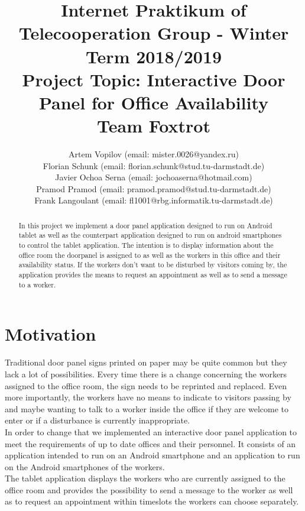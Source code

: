 \documentclass[article,colorback,accentcolor=tud4c, 11pt]{tudreport}
\title{Internet Praktikum of Telecooperation Group - Winter Term 2018/2019\\
	Project Topic: Interactive Door Panel for Office Availability\\ Team Foxtrot}
\subtitle{Artem Vopilov (email: mister.0026@yandex.ru)\\Florian Schunk (email: florian.schunk@stud.tu-darmstadt.de)\\ Javier Ochoa Serna (email: jochoaserna@hotmail.com)\\
	Pramod Pramod (email: pramod.pramod@stud.tu-darmstadt.de) \\ Frank Langoulant (email: fl1001@rbg.informatik.tu-darmstadt.de)}
\begin{document}
	\maketitle
	\begin{abstract}
		In this project we implement a door panel application designed to run on  Android tablet as well as the counterpart application designed to run on android smartphones to control the tablet application. The intention is to display information about the office room the doorpanel is assigned to as well as the workers in this office and their availability status. If the workers don't want to be disturbed by visitors coming by, the application provides the means to request an appointment as well as to send a message to a worker.
	\end{abstract}  
	
	\tableofcontents
	\newpage
	
	\section{Motivation}
	
Traditional door panel signs printed on paper may be quite common but they lack a lot of possibilities. Every time there is a change concerning the workers assigned to the office room, the sign needs to be reprinted and replaced. Even more importantly, the workers have no means to indicate to visitors passing by and maybe wanting to talk to a worker inside the office if they are welcome to enter or if a disturbance is currently inappropriate. \\

In order to change that we implemented an interactive door panel application to meet the requirements of up to date offices and their personnel. It consists of an application intended to run on an Android smartphone and an application to run on the Android smartphones of the workers. \\

The tablet application displays the workers who are currently assigned to the office room and provides the possibility to send a message to the worker as well as to request an appointment within timeslots the workers can choose separately. \\
\end{document}
